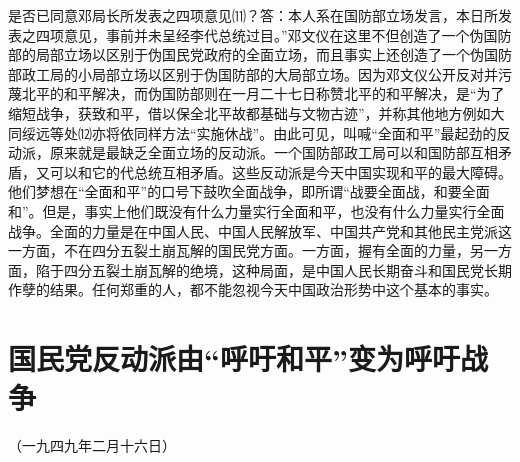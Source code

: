 \documentclass[UTF-8, a5paper, 12pt]{ctexart}
\begin{document}
是否已同意邓局长所发表之四项意见⑾？答：本人系在国防部立场发言，本日所发表之四项意见，事前并未呈经李代总统过目。”邓文仪在这里不但创造了一个伪国防部的局部立场以区别于伪国民党政府的全面立场，而且事实上还创造了一个伪国防部政工局的小局部立场以区别于伪国防部的大局部立场。因为邓文仪公开反对并污蔑北平的和平解决，而伪国防部则在一月二十七日称赞北平的和平解决，是“为了缩短战争，获致和平，借以保全北平故都基础与文物古迹”，并称其他地方例如大同绥远等处⑿亦将依同样方法“实施休战”。由此可见，叫喊“全面和平”最起劲的反动派，原来就是最缺乏全面立场的反动派。一个国防部政工局可以和国防部互相矛盾，又可以和它的代总统互相矛盾。这些反动派是今天中国实现和平的最大障碍。他们梦想在“全面和平”的口号下鼓吹全面战争，即所谓“战要全面战，和要全面和”。但是，事实上他们既没有什么力量实行全面和平，也没有什么力量实行全面战争。全面的力量是在中国人民、中国人民解放军、中国共产党和其他民主党派这一方面，不在四分五裂土崩瓦解的国民党方面。一方面，握有全面的力量，另一方面，陷于四分五裂土崩瓦解的绝境，这种局面，是中国人民长期奋斗和国民党长期作孽的结果。任何郑重的人，都不能忽视今天中国政治形势中这个基本的事实。

\section{国民党反动派由“呼吁和平”变为呼吁战争}

（一九四九年二月十六日）
\end{document}
